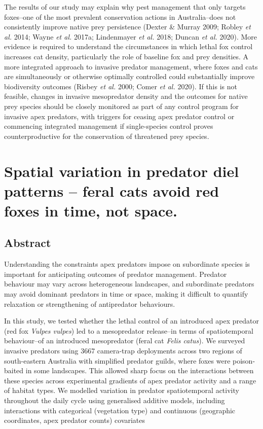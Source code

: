 \documentclass[11pt,a4paper,titlepage,twoside,openright]{style/unimelbthesis}
\begin{document}
\begin{mainmatter}
The results of our study may explain why pest management that only targets foxes--one of the most prevalent conservation actions in Australia--does not consistently improve native prey persistence (Dexter \& Murray 2009; Robley \emph{et al.} 2014; Wayne \emph{et al.} 2017a; Lindenmayer \emph{et al.} 2018; Duncan \emph{et al.} 2020). More evidence is required to understand the circumstances in which lethal fox control increases cat density, particularly the role of baseline fox and prey densities. A more integrated approach to invasive predator management, where foxes and cats are simultaneously or otherwise optimally controlled could substantially improve biodiversity outcomes (Risbey \emph{et al.} 2000; Comer \emph{et al.} 2020). If this is not feasible, changes in invasive mesopredator density and the outcomes for native prey species should be closely monitored as part of any control program for invasive apex predators, with triggers for ceasing apex predator control or commencing integrated management if single-species control proves counterproductive for the conservation of threatened prey species.

\hypertarget{diel}{%
\chapter{Spatial variation in predator diel patterns -- feral cats avoid red foxes in time, not space.}\label{diel}}

\hypertarget{abstract-3}{%
\section*{Abstract}\label{abstract-3}}

Understanding the constraints apex predators impose on subordinate species is important for anticipating outcomes of predator management. Predator behaviour may vary across heterogeneous landscapes, and subordinate predators may avoid dominant predators in time or space, making it difficult to quantify relaxation or strengthening of antipredator behaviours.

In this study, we tested whether the lethal control of an introduced apex predator (red fox \emph{Vulpes vulpes}) led to a mesopredator release--in terms of spatiotemporal behaviour--of an introduced mesopredator (feral cat \emph{Felis catus}). We surveyed invasive predators using 3667 camera-trap deployments across two regions of south-eastern Australia with simplified predator guilds, where foxes were poison-baited in some landscapes. This allowed sharp focus on the interactions between these species across experimental gradients of apex predator activity and a range of habitat types. We modelled variation in predator spatiotemporal activity throughout the daily cycle using generalised additive models, including interactions with categorical (vegetation type) and continuous (geographic coordinates, apex predator counts) covariates


\end{mainmatter}
\end{document}
